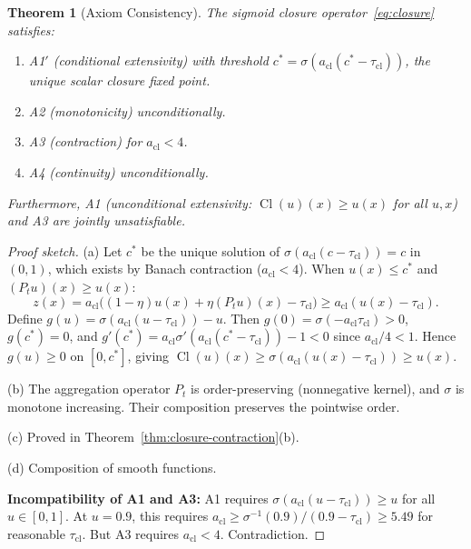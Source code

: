 \documentclass[lettersize,journal]{IEEEtran}
\newtheorem{theorem}{Theorem}
\DeclareMathOperator{\Cl}{Cl}
\begin{document}
\begin{theorem}[Axiom Consistency]
\label{thm:axiom-consistency}
The sigmoid closure operator~\eqref{eq:closure} satisfies:
\begin{enumerate}
\item[(a)] A1$'$ (conditional extensivity) with threshold $c^* = \sigma(a_{\mathrm{cl}}(c^* - \tau_{\mathrm{cl}}))$, the unique scalar closure fixed point.
\item[(b)] A2 (monotonicity) unconditionally.
\item[(c)] A3 (contraction) for $a_{\mathrm{cl}} < 4$.
\item[(d)] A4 (continuity) unconditionally.
\end{enumerate}
Furthermore, A1 (unconditional extensivity: $\Cl(u)(x) \geq u(x)$ for all $u, x$) and A3 are jointly unsatisfiable.
\end{theorem}

\begin{proof}[Proof sketch]
(a) Let $c^*$ be the unique solution of $\sigma(a_{\mathrm{cl}}(c - \tau_{\mathrm{cl}})) = c$ in $(0,1)$, which exists by Banach contraction ($a_{\mathrm{cl}} < 4$). When $u(x) \leq c^*$ and $(P_t u)(x) \geq u(x)$:
\[
z(x) = a_{\mathrm{cl}}\bigl((1-\eta)u(x) + \eta(P_t u)(x) - \tau_{\mathrm{cl}}\bigr) \geq a_{\mathrm{cl}}(u(x) - \tau_{\mathrm{cl}}).
\]
Define $g(u) = \sigma(a_{\mathrm{cl}}(u - \tau_{\mathrm{cl}})) - u$. Then $g(0) = \sigma(-a_{\mathrm{cl}}\tau_{\mathrm{cl}}) > 0$, $g(c^*) = 0$, and $g'(c^*) = a_{\mathrm{cl}}\sigma'(a_{\mathrm{cl}}(c^* - \tau_{\mathrm{cl}})) - 1 < 0$ since $a_{\mathrm{cl}}/4 < 1$. Hence $g(u) \geq 0$ on $[0, c^*]$, giving $\Cl(u)(x) \geq \sigma(a_{\mathrm{cl}}(u(x) - \tau_{\mathrm{cl}})) \geq u(x)$.

(b) The aggregation operator $P_t$ is order-preserving (nonnegative kernel), and $\sigma$ is monotone increasing. Their composition preserves the pointwise order.

(c) Proved in Theorem~\ref{thm:closure-contraction}(b).

(d) Composition of smooth functions.

\textbf{Incompatibility of A1 and A3:} A1 requires $\sigma(a_{\mathrm{cl}}(u - \tau_{\mathrm{cl}})) \geq u$ for all $u \in [0,1]$. At $u = 0.9$, this requires $a_{\mathrm{cl}} \geq \sigma^{-1}(0.9)/(0.9 - \tau_{\mathrm{cl}}) \geq 5.49$ for reasonable $\tau_{\mathrm{cl}}$. But A3 requires $a_{\mathrm{cl}} < 4$. Contradiction.
\end{proof}
\end{document}
